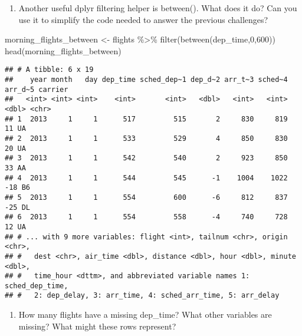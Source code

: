 \documentclass[
]{article}
\newenvironment{Shaded}{\begin{snugshade}}{\end{snugshade}}
\newcommand{\DecValTok}[1]{\textcolor[rgb]{0.00,0.00,0.81}{#1}}
\newcommand{\FunctionTok}[1]{\textcolor[rgb]{0.00,0.00,0.00}{#1}}
\newcommand{\NormalTok}[1]{#1}
\newcommand{\OtherTok}[1]{\textcolor[rgb]{0.56,0.35,0.01}{#1}}
\newcommand{\SpecialCharTok}[1]{\textcolor[rgb]{0.00,0.00,0.00}{#1}}
\providecommand{\tightlist}{%
  \setlength{\itemsep}{0pt}\setlength{\parskip}{0pt}}
\begin{document}
\begin{enumerate}
\def\labelenumi{\arabic{enumi}.}
\setcounter{enumi}{1}
\tightlist
\item
  Another useful dplyr filtering helper is between(). What does it do?
  Can you use it to simplify the code needed to answer the previous
  challenges?
\end{enumerate}

\begin{Shaded}
\begin{Highlighting}[]
\NormalTok{morning\_flights\_between }\OtherTok{\textless{}{-}}\NormalTok{ flights }\SpecialCharTok{\%\textgreater{}\%} \FunctionTok{filter}\NormalTok{(}\FunctionTok{between}\NormalTok{(dep\_time,}\DecValTok{0}\NormalTok{,}\DecValTok{600}\NormalTok{))}
\FunctionTok{head}\NormalTok{(morning\_flights\_between)}
\end{Highlighting}
\end{Shaded}

\begin{verbatim}
## # A tibble: 6 x 19
##    year month   day dep_time sched_dep~1 dep_d~2 arr_t~3 sched~4 arr_d~5 carrier
##   <int> <int> <int>    <int>       <int>   <dbl>   <int>   <int>   <dbl> <chr>  
## 1  2013     1     1      517         515       2     830     819      11 UA     
## 2  2013     1     1      533         529       4     850     830      20 UA     
## 3  2013     1     1      542         540       2     923     850      33 AA     
## 4  2013     1     1      544         545      -1    1004    1022     -18 B6     
## 5  2013     1     1      554         600      -6     812     837     -25 DL     
## 6  2013     1     1      554         558      -4     740     728      12 UA     
## # ... with 9 more variables: flight <int>, tailnum <chr>, origin <chr>,
## #   dest <chr>, air_time <dbl>, distance <dbl>, hour <dbl>, minute <dbl>,
## #   time_hour <dttm>, and abbreviated variable names 1: sched_dep_time,
## #   2: dep_delay, 3: arr_time, 4: sched_arr_time, 5: arr_delay
\end{verbatim}

\begin{enumerate}
\def\labelenumi{\arabic{enumi}.}
\setcounter{enumi}{2}
\tightlist
\item
  How many flights have a missing dep\_time? What other variables are
  missing? What might these rows represent?
\end{enumerate}

\begin{Shaded}
\end{Shaded}
\end{document}

